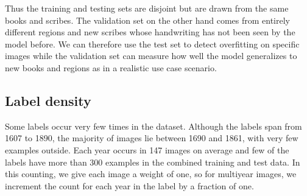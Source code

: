 Thus the training and testing sets are disjoint but are drawn from the same books and scribes. The validation set on the other hand comes from entirely different regions and new scribes whose handwriting has not been seen by the model before. We can therefore use the test set to detect overfitting on specific images while the validation set can measure how well the model generalizes to new books and regions as in a realistic use case scenario.



\subsection{Label density} \label{sssec:few_labels}

Some labels occur very few times in the dataset. Although the labels span from 1607 to 1890, the majority of images lie between 1690 and 1861, with very few examples outside. Each year occurs in 147 images on average and few of the labels have more than 300 examples in the combined training and test data.
In this counting, we give each image a weight of one, so for multiyear images, we increment the count for each year in the label by a fraction of one.
